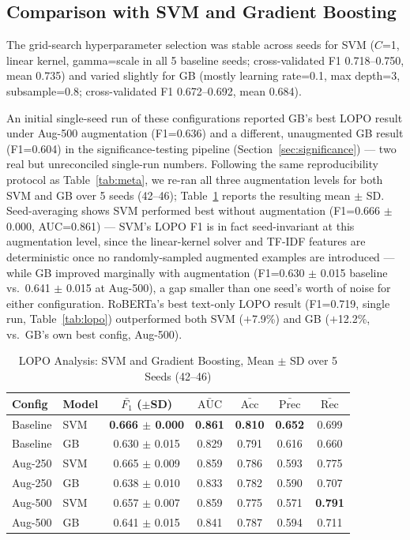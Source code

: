 \documentclass[preprint,12pt]{elsarticle}
\begin{document}
\subsection{Comparison with SVM and Gradient Boosting}

The grid-search hyperparameter selection was stable across seeds for SVM ($C$=1, linear kernel, gamma=scale in all 5 baseline seeds; cross-validated F1 0.718--0.750, mean 0.735) and varied slightly for GB (mostly learning rate=0.1, max depth=3, subsample=0.8; cross-validated F1 0.672--0.692, mean 0.684).

An initial single-seed run of these configurations reported GB's best LOPO result under Aug-500 augmentation (F1=0.636) and a different, unaugmented GB result (F1=0.604) in the significance-testing pipeline (Section~\ref{sec:significance}) — two real but unreconciled single-run numbers. Following the same reproducibility protocol as Table~\ref{tab:meta}, we re-ran all three augmentation levels for both SVM and GB over 5 seeds (42--46); Table~\ref{tab:lopo_trad} reports the resulting mean $\pm$ SD. Seed-averaging shows SVM performed best without augmentation (F1=0.666 $\pm$ 0.000, AUC=0.861) — SVM's LOPO F1 is in fact seed-invariant at this augmentation level, since the linear-kernel solver and TF-IDF features are deterministic once no randomly-sampled augmented examples are introduced — while GB improved marginally with augmentation (F1=0.630 $\pm$ 0.015 baseline vs.\ 0.641 $\pm$ 0.015 at Aug-500), a gap smaller than one seed's worth of noise for either configuration. RoBERTa's best text-only LOPO result (F1=0.719, single run, Table~\ref{tab:lopo}) outperformed both SVM ($+$7.9\%) and GB ($+$12.2\%, vs.\ GB's own best config, Aug-500).

\begin{table}[t]
\centering
\setlength{\tabcolsep}{3pt}
\begin{tabular}{llccccc}
\toprule
\textbf{Config} & \textbf{Model} & \textbf{$\bar{F_1}$ ($\pm$SD)} & \textbf{$\bar{\text{AUC}}$} & \textbf{$\bar{\text{Acc}}$} & \textbf{$\bar{\text{Prec}}$} & \textbf{$\bar{\text{Rec}}$} \\
\midrule
Baseline & SVM & \textbf{0.666 $\pm$ 0.000} & \textbf{0.861} & \textbf{0.810} & \textbf{0.652} & 0.699 \\
Baseline & GB & 0.630 $\pm$ 0.015 & 0.829 & 0.791 & 0.616 & 0.660 \\
Aug-250 & SVM & 0.665 $\pm$ 0.009 & 0.859 & 0.786 & 0.593 & 0.775 \\
Aug-250 & GB & 0.638 $\pm$ 0.010 & 0.833 & 0.782 & 0.590 & 0.707 \\
Aug-500 & SVM & 0.657 $\pm$ 0.007 & 0.859 & 0.775 & 0.571 & \textbf{0.791} \\
Aug-500 & GB & 0.641 $\pm$ 0.015 & 0.841 & 0.787 & 0.594 & 0.711 \\
\bottomrule
\end{tabular}
\caption{LOPO Analysis: SVM and Gradient Boosting, Mean $\pm$ SD over 5 Seeds (42--46)}
\label{tab:lopo_trad}
\end{table}
\end{document}

